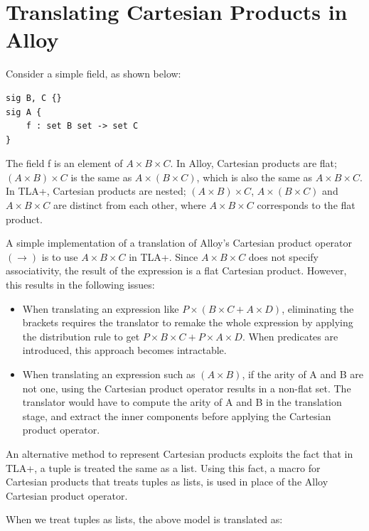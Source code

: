 \section{Translating Cartesian Products in Alloy}

Consider a simple field, as shown below:

\begin{lstlisting}
sig B, C {}
sig A {
	f : set B set -> set C
}
\end{lstlisting}

The field f is an element of $A \times B \times C$. In Alloy, Cartesian products are flat; $(A \times B) \times C$ is the same as $A \times (B \times C)$, which is also the same as $A \times B \times C$. In TLA+, Cartesian products are nested; $(A \times B) \times C$, $A \times (B \times C)$ and $A \times B \times C$ are distinct from each other, where $A \times B \times C$ corresponds to the flat product.

A simple implementation of a translation of Alloy's Cartesian product operator $(\rightarrow)$ is to use $A \times B \times C$ in TLA+. Since $A \times B \times C$ does not specify associativity, the result of the expression is a flat Cartesian product. However, this results in the following issues:

\begin{itemize}
	\item When translating an expression like $P \times (B \times C + A \times D)$, eliminating the brackets requires the translator to remake the whole expression by applying the distribution rule to get $P \times B \times C + P \times A \times D$. When predicates are introduced, this approach becomes intractable.
	\item When translating an expression such as $(A \times B)$, if the arity of A and B are not one, using the Cartesian product operator results in a non-flat set. The translator would have to compute the arity of A and B in the translation stage, and extract the inner components before applying the Cartesian product operator. 
\end{itemize}

An alternative method to represent Cartesian products exploits the fact that in TLA+, a tuple is treated the same as a list. Using this fact, a macro for Cartesian products that treats tuples as lists, is used in place of the Alloy Cartesian product operator.

When we treat tuples as lists, the above model is translated as:

